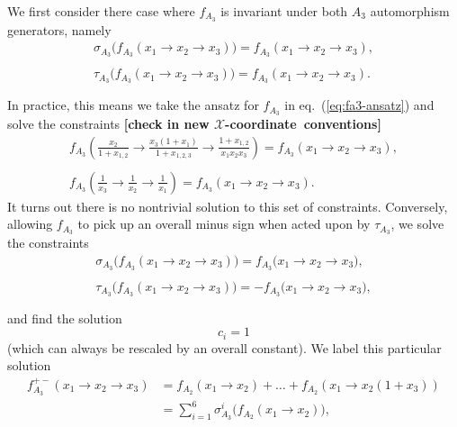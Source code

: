 \documentclass[11pt]{article}
\def\xcoord{$\mathcal{X}$-coordinate}
\def\draftnote#1{{\bf [#1]}}
\begin{document}
We first consider there case where $f_{A_3}$ is invariant under both $A_3$ automorphism generators, namely
\begin{equation}\label{eq:fA3++}
\begin{gathered}
	\sigma_{A_3}\big(f_{A_3} (x_1 \to x_2\to x_3) \big) = f_{A_3}(x_1 \to x_2\to x_3),\\ \\[-1.2em]
	\tau_{A_3}\big(f_{A_3} (x_1 \to x_2\to x_3) \big) = f_{A_3}(x_1 \to x_2\to x_3). \\ \\[-1.4em]
\end{gathered}
\end{equation}
In practice, this means we take the ansatz for $f_{A_3}$ in eq.~(\ref{eq:fa3-ansatz}) and solve the constraints  \draftnote{check in new \xcoord\ conventions}
\begin{equation}
\begin{gathered}
	f_{A_3}\left(\frac{x_2}{1+ x_{1,2}}\to \frac{x_3(1+x_1)}{1+x_{1,2,3}}\to \frac{1+x_{1,2}}{x_1x_2x_3}\right) = f_{A_3}(x_1\to x_2\to x_3),\\ \\[-1.4em]
	f_{A_3}\left(\frac{1}{x_3} \to \frac{1}{x_2} \to \frac{1}{x_1}\right) = f_{A_3}(x_1\to x_2\to x_3).  
\end{gathered}
\end{equation}
It turns out there is no nontrivial solution to this set of constraints. Conversely, allowing $f_{A_3}$ to pick up an overall minus sign when acted upon by $\tau_{A_3}$, we solve the constraints
\begin{equation}
\begin{gathered}
	\sigma_{A_3}\big(f_{A_3}(x_1\to x_2\to x_3)\big) = f_{A_3}\big(x_1\to x_2\to x_3 \big),\\ \\[-1.2em]
	 \tau_{A_3}\big(f_{A_3}(x_1\to x_2\to x_3)\big) = -f_{A_3}\big(x_1\to x_2\to x_3 \big),  \\ \\[-1.4em]
\end{gathered}
\end{equation}
and find the solution 
\begin{equation}
	c_i = 1
\end{equation}
(which can always be rescaled by an overall constant). We label this particular solution
\begin{align}
	f_{A_3}^{+-}(x_1\to x_2\to x_3) &= f_{A_2}(x_1 \to x_2) + \ldots + f_{A_2}(x_1\to x_2 \left(1+x_3\right)) \nonumber \\
	&= \sum_{i=1}^6 \sigma_{A_3}^i\big(f_{A_2}(x_1\to x_2)\big),
\end{align}
\end{document}
